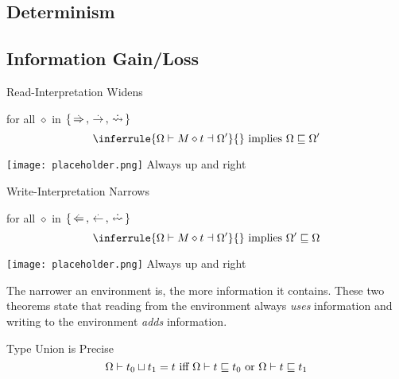 \documentclass[12pt,twoside]{report}
\begin{document}
\subsection{Determinism}

\subsection{Information Gain/Loss}
\begin{Property}{Read-Interpretation Widens}{} %
  \begin{minipage}{0.6\textwidth}
    \centering
    for all $\diamond$ in $\{ \,\stackrel{.}{\Rightarrow}\,, \,\stackrel{.}{\rightarrow}\,, \,\dot{\rightsquigarrow}\, \}$
    \[
      \inferrule{
        \Omega \vdash M \diamond t \dashv \Omega'
      }{}
      \text{   implies   }
      \Omega \subtype \Omega'
    \]
  \end{minipage}
  \begin{minipage}{0.3\textwidth}
    \centering
    \texttt{[image: placeholder.png]}
    Always up and right
  \end{minipage}
\end{Property}
\label{theorem:expressionreadwidens}


\begin{Property}{Write-Interpretation Narrows}{} %
  \begin{minipage}{0.6\textwidth}
    \centering
    for all $\diamond$ in $\{ \writearrowabs, \narrowarrowabs, \erasedwritearrow \}$
    \[
      \inferrule{
        \Omega \vdash M \diamond t \dashv \Omega'
      }{}
      \text{   implies   }
      \Omega' \subtype \Omega
    \]
  \end{minipage}
  \begin{minipage}{0.3\textwidth}
    \centering
    \texttt{[image: placeholder.png]}
    Always up and right
  \end{minipage}
\end{Property}
\label{theorem:expressionwritewidens}

The narrower an environment is, the more information it contains. These two theorems state that reading from the environment always \textit{uses} information and writing to the environment \textit{adds} information.

\begin{Property}{Type Union is Precise}{}
  \[
    \Omega \vdash t_0 \sqcup t_1 = t
    \text{   iff   }
    \Omega \vdash t \sqsubseteq t_0
    \text{   or   } 
    \Omega \vdash t \sqsubseteq t_1
  \]
\end{Property}
\label{theorem:precisetypeunion}
\end{document}

